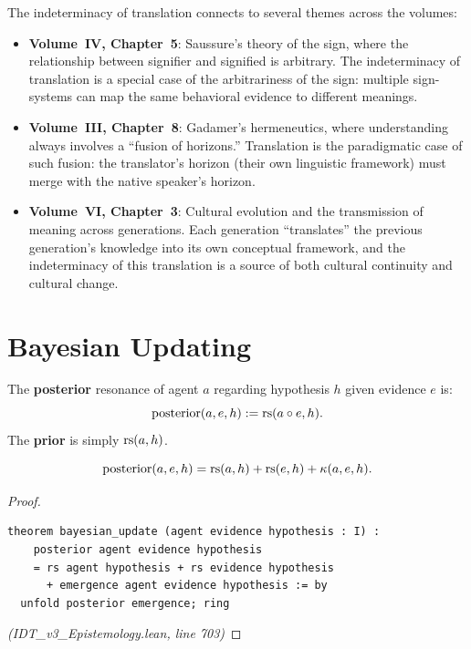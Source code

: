\begin{remark}
The indeterminacy of translation connects to several themes across the volumes:

\begin{itemize}
\item \textbf{Volume~IV, Chapter~5}: Saussure's theory of the sign, where the
  relationship between signifier and signified is arbitrary. The indeterminacy of
  translation is a special case of the arbitrariness of the sign: multiple
  sign-systems can map the same behavioral evidence to different meanings.
\item \textbf{Volume~III, Chapter~8}: Gadamer's hermeneutics, where understanding
  always involves a ``fusion of horizons.'' Translation is the paradigmatic case of
  such fusion: the translator's horizon (their own linguistic framework) must
  merge with the native speaker's horizon.
\item \textbf{Volume~VI, Chapter~3}: Cultural evolution and the transmission of
  meaning across generations. Each generation ``translates'' the previous
  generation's knowledge into its own conceptual framework, and the indeterminacy
  of this translation is a source of both cultural continuity and cultural change.
\end{itemize}
\end{remark}


\section{Bayesian Updating}

\begin{definition}
\label{def:bayesian}
The \textbf{posterior} resonance of agent $a$ regarding hypothesis $h$ given
evidence $e$ is:
\[
  \mathrm{posterior}(a, e, h) := \mathrm{rs}(a \circ e, h).
\]
The \textbf{prior} is simply $\mathrm{rs}(a, h)$.
\end{definition}

\begin{theorem}
\label{thm:bayesian-update}
\[
  \mathrm{posterior}(a, e, h) = \mathrm{rs}(a, h) + \mathrm{rs}(e, h) + \kappa(a, e, h).
\]
\end{theorem}

\begin{proof}
\begin{lstlisting}
theorem bayesian_update (agent evidence hypothesis : I) :
    posterior agent evidence hypothesis
    = rs agent hypothesis + rs evidence hypothesis
      + emergence agent evidence hypothesis := by
  unfold posterior emergence; ring
\end{lstlisting}
\textit{(IDT\_v3\_Epistemology.lean, line 703)}
\end{proof}


